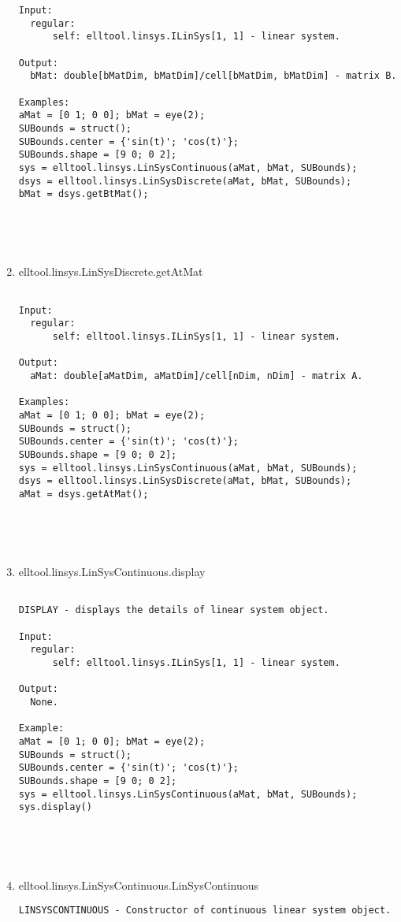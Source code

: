 \begin{enumerate}
\begin{lstlisting}
Input:
  regular:
      self: elltool.linsys.ILinSys[1, 1] - linear system.

Output:
  bMat: double[bMatDim, bMatDim]/cell[bMatDim, bMatDim] - matrix B.

Examples:
aMat = [0 1; 0 0]; bMat = eye(2);
SUBounds = struct();
SUBounds.center = {'sin(t)'; 'cos(t)'};
SUBounds.shape = [9 0; 0 2];
sys = elltool.linsys.LinSysContinuous(aMat, bMat, SUBounds);
dsys = elltool.linsys.LinSysDiscrete(aMat, bMat, SUBounds);
bMat = dsys.getBtMat();





\end{lstlisting}
\fontfamily{\familydefault}
\selectfont
\item {elltool.linsys.LinSysDiscrete.getAtMat}
\selectfont
\begin{lstlisting}

Input:
  regular:
      self: elltool.linsys.ILinSys[1, 1] - linear system.

Output:
  aMat: double[aMatDim, aMatDim]/cell[nDim, nDim] - matrix A.

Examples:
aMat = [0 1; 0 0]; bMat = eye(2);
SUBounds = struct();
SUBounds.center = {'sin(t)'; 'cos(t)'};
SUBounds.shape = [9 0; 0 2];
sys = elltool.linsys.LinSysContinuous(aMat, bMat, SUBounds);
dsys = elltool.linsys.LinSysDiscrete(aMat, bMat, SUBounds);
aMat = dsys.getAtMat();





\end{lstlisting}
\fontfamily{\familydefault}
\selectfont
\item {elltool.linsys.LinSysContinuous.display}
\selectfont
\begin{lstlisting}

DISPLAY - displays the details of linear system object.

Input:
  regular:
      self: elltool.linsys.ILinSys[1, 1] - linear system.

Output:
  None.

Example:
aMat = [0 1; 0 0]; bMat = eye(2);
SUBounds = struct();
SUBounds.center = {'sin(t)'; 'cos(t)'};
SUBounds.shape = [9 0; 0 2];
sys = elltool.linsys.LinSysContinuous(aMat, bMat, SUBounds);
sys.display()





\end{lstlisting}
\fontfamily{\familydefault}
\selectfont
\item {elltool.linsys.LinSysContinuous.LinSysContinuous}
\selectfont
\begin{lstlisting}
LINSYSCONTINUOUS - Constructor of continuous linear system object.


\end{lstlisting}
\end{enumerate}
